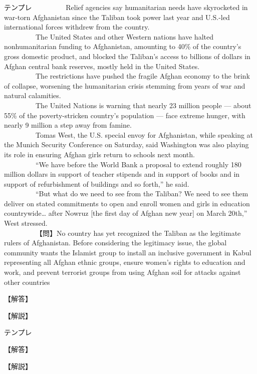 \documentclass[b4paper,fleqn,dvipdfmx]{jsarticle}
\begin{document}
\begin{itembox}[l]{テンプレ}
\ \ \ \ \ \ \ \ \ Relief agencies say humanitarian needs have skyrocketed in war-torn Afghanistan since the Taliban took power last year and U.S.-led international forces withdrew from the country.\\
\ \ \ \ \ \ \ \ \ The United States and other Western nations have halted nonhumanitarian funding to Afghanistan, amounting to 40\% of the country’s gross domestic product, and blocked the Taliban’s access to billions of dollars in Afghan central bank reserves, mostly held in the United States.\\
\ \ \ \ \ \ \ \ \ The restrictions have pushed the fragile Afghan economy to the brink of collapse, worsening the humanitarian crisis stemming from years of war and natural calamities.\\
\ \ \ \ \ \ \ \ \ The United Nations is warning that nearly 23 million people — about 55\% of the poverty-stricken country's population — face extreme hunger, with nearly 9 million a step away from famine.\\
\ \ \ \ \ \ \ \ \ Tomas West, the U.S. special envoy for Afghanistan, while speaking at the Munich Security Conference on Saturday, said Washington was also playing its role in ensuring Afghan girls return to schools next month.\\
\ \ \ \ \ \ \ \ \ “We have before the World Bank a proposal to extend roughly 180 million dollars in support of teacher stipends and in support of books and in support of refurbishment of buildings and so forth,” he said.\\
\ \ \ \ \ \ \ \ \ “But what do we need to see from the Taliban? We need to see them deliver on stated commitments to open and enroll women and girls in education countrywide… after Nowruz [the first day of Afghan new year] on March 20th,” West stressed.\\
\ \ \ \ \ \ \ \ \ 【問】No country has yet recognized the Taliban as the legitimate rulers of Afghanistan. Before considering the legitimacy issue, the global community wants the Islamist group to install an inclusive government in Kabul representing all Afghan ethnic groups, ensure women’s rights to education and work, and prevent terrorist groups from using Afghan soil for attacks against other countries

\end{itembox}


\begin{flushleft}
【解答】
\end{flushleft}



\begin{flushleft}
【解説】
\end{flushleft}

\newpage

\begin{itembox}[l]{テンプレ}



\end{itembox}


\begin{flushleft}
【解答】
\end{flushleft}



\begin{flushleft}
【解説】
\end{flushleft}
\end{document}
